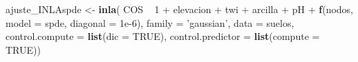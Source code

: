 \documentclass[11pt,b5paper,]{krantz}
\newenvironment{Shaded}{}{}
\newcommand{\DataTypeTok}[1]{\textcolor[rgb]{0.56,0.13,0.00}{#1}}
\newcommand{\DecValTok}[1]{\textcolor[rgb]{0.25,0.63,0.44}{#1}}
\newcommand{\FloatTok}[1]{\textcolor[rgb]{0.25,0.63,0.44}{#1}}
\newcommand{\KeywordTok}[1]{\textcolor[rgb]{0.00,0.44,0.13}{\textbf{#1}}}
\newcommand{\NormalTok}[1]{#1}
\newcommand{\OperatorTok}[1]{\textcolor[rgb]{0.40,0.40,0.40}{#1}}
\newcommand{\OtherTok}[1]{\textcolor[rgb]{0.00,0.44,0.13}{#1}}
\newcommand{\StringTok}[1]{\textcolor[rgb]{0.25,0.44,0.63}{#1}}
\begin{document}
\begin{Shaded}
\begin{Highlighting}[]
\NormalTok{ajuste_INLAspde <-}\StringTok{ }\KeywordTok{inla}\NormalTok{(}
\NormalTok{  COS }\OperatorTok{~}\StringTok{ }\DecValTok{1} \OperatorTok{+}\StringTok{ }\NormalTok{elevacion }\OperatorTok{+}\StringTok{ }\NormalTok{twi }\OperatorTok{+}\StringTok{ }\NormalTok{arcilla }\OperatorTok{+}\StringTok{ }\NormalTok{pH }\OperatorTok{+}
\StringTok{    }\KeywordTok{f}\NormalTok{(nodos, }\DataTypeTok{model =}\NormalTok{ spde, }\DataTypeTok{diagonal =} \FloatTok{1e-6}\NormalTok{),}
  \DataTypeTok{family =} \StringTok{'gaussian'}\NormalTok{,}
  \DataTypeTok{data =}\NormalTok{ suelos,}
  \DataTypeTok{control.compute =} \KeywordTok{list}\NormalTok{(}\DataTypeTok{dic =} \OtherTok{TRUE}\NormalTok{),}
  \DataTypeTok{control.predictor =} \KeywordTok{list}\NormalTok{(}\DataTypeTok{compute =} \OtherTok{TRUE}\NormalTok{))}


\end{Highlighting}
\end{Shaded}
\end{document}

